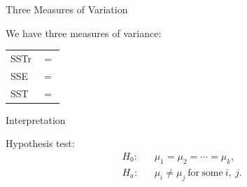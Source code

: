 \begin{frame}{Three Measures of Variation}

  We have three measures of variance: \\
  \begin{tabular}{ll}
    SSTr & $=$ \\
    SSE  & $=$ \\
    SST  & $=$  
  \end{tabular}
  
\end{frame}

\begin{frame}{Interpretation}

  Hypothesis test:
  \begin{eqnarray*}
    H_0: & & \mu_1 = \mu_2 = \cdots = \mu_k, \\
    H_a: & & \mu_i \neq \mu_j ~\mathrm{for~some~}i,~j.
  \end{eqnarray*}

  
\end{frame}

